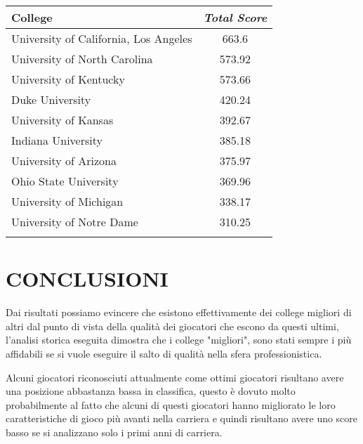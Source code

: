 \documentclass[10pt,a4paper,twocolumn]{article}
\begin{document}
\begin{table*}[t]
\begin{tabular}{lc}
	\end{tabular}
	
	\begin{tabular}{lc}
		College & \textit{Total Score}  \\
		\hline
		University of California, Los Angeles & 663.6\\
		University of North Carolina & 573.92\\
		University of Kentucky & 573.66\\
		Duke University & 420.24\\
		University of Kansas & 392.67\\
		Indiana University & 385.18\\
		University of Arizona & 375.97\\
		Ohio State University & 369.96\\
		University of Michigan & 338.17\\
		University of Notre Dame & 310.25\\
		&\\
		
	\end{tabular}
	
\end{table*}

\section{CONCLUSIONI}

Dai risultati possiamo evincere che esistono effettivamente dei college migliori di altri dal punto di vista della qualità dei giocatori che escono da questi ultimi, l'analisi storica eseguita dimostra che i college "migliori", sono stati sempre i più affidabili se si vuole eseguire il salto di qualità nella sfera professionistica.

Alcuni giocatori riconosciuti attualmente come ottimi giocatori risultano avere una posizione abbastanza bassa in classifica, questo è dovuto molto probabilmente al fatto che alcuni di questi giocatori hanno migliorato le loro caratteristiche di gioco più avanti nella carriera e quindi risultano avere uno score basso se si analizzano solo i primi anni di carriera.
\end{document}
